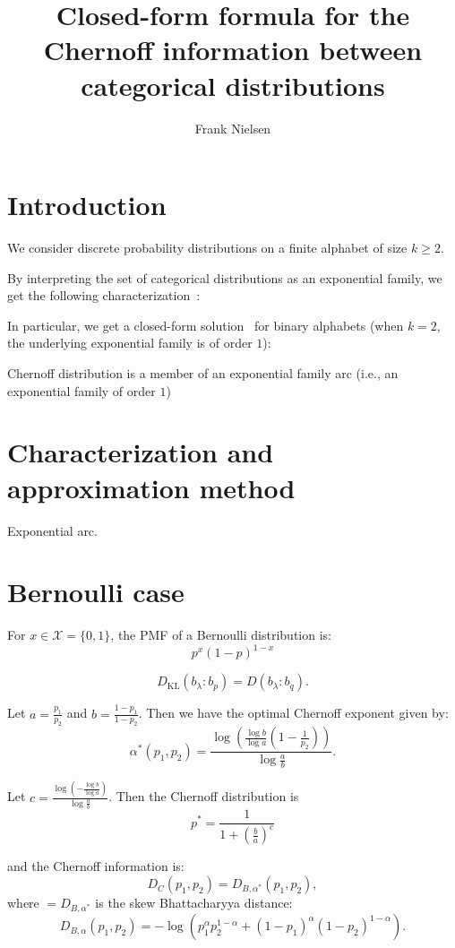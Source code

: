 \documentclass[11pt]{article}
\title{Closed-form formula for the Chernoff information between categorical distributions}
\author{Frank Nielsen}
\def\calX{\mathcal{X}}
\def\KL{\mathrm{KL}}
\begin{document}
\maketitle


\section{Introduction}

We consider discrete probability distributions on a finite alphabet of size $k\geq 2$.


By interpreting the set of categorical distributions as an exponential family, we get the following characterization~\cite{}:


In particular, we get a closed-form solution~\cite{CI-2013} for binary alphabets (when $k=2$, the underlying exponential family is of order $1$):



Chernoff distribution is a member of an exponential family arc (i.e., an exponential family of order $1$)


\nocite{*}


\section{Characterization and approximation method}

Exponential arc.


\section{Bernoulli case}

For $x\in\calX=\{0,1\}$, the PMF of a Bernoulli distribution is:
$$
p^x (1-p)^{1-x}
$$


$$
D_\KL(b_\lambda:b_p)=D(b_\lambda:b_q).
$$




 


Let $a=\frac{p_1}{p_2}$ and $b=\frac{1-p_1}{1-p_2}$.
Then we have the optimal Chernoff exponent given by:
$$
\alpha^*(p_1,p_2) = \frac{\log \left( \frac{\log b}{\log a} (1-\frac{1}{p_2}) \right)}{\log \frac{a}{b}}.
$$

Let $c=\frac{\log(-\frac{\log b}{\log a})}{\log\frac{a}{b}}$.
Then the Chernoff distribution is
$$
p^*=\frac{1}{1+(\frac{b}{a})^c}
$$

and the Chernoff information is:
$$
D_C(p_1,p_2)=D_{B,\alpha^*}(p_1,p_2),
$$
where $=D_{B,\alpha^*}$ is the skew Bhattacharyya distance:
$$
D_{B,\alpha}(p_1,p_2) = -\log \left(p_1^\alpha p_2^{1-\alpha} + (1-p_1)^\alpha (1-p_2)^{1-\alpha} \right).
$$
\end{document}

